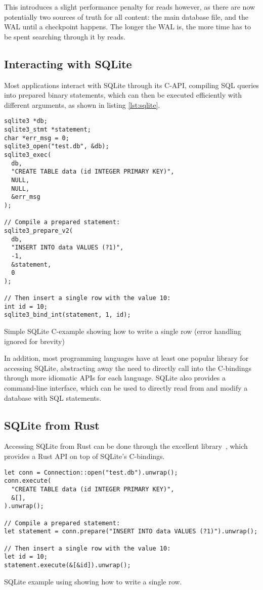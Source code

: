 This introduces a slight performance penalty for reads however, as there are now
potentially two sources of truth for all content: the main database file, and
the WAL until a checkpoint happens. The longer the WAL is, the more time has to
be spent searching through it by reads.

\subsection{Interacting with SQLite}
Most applications interact with SQLite through its C-API, compiling SQL
queries into prepared binary statements, which can then be executed efficiently
with different arguments, as shown in listing \ref{lst:sqlite}.

\begin{listing}[H]
  \begin{verbatim}
sqlite3 *db;
sqlite3_stmt *statement;
char *err_msg = 0;
sqlite3_open("test.db", &db);
sqlite3_exec(
  db,
  "CREATE TABLE data (id INTEGER PRIMARY KEY)",
  NULL,
  NULL,
  &err_msg
);

// Compile a prepared statement:
sqlite3_prepare_v2(
  db,
  "INSERT INTO data VALUES (?1)",
  -1,
  &statement,
  0
);

// Then insert a single row with the value 10:
int id = 10;
sqlite3_bind_int(statement, 1, id);
  \end{verbatim}

  \caption{Simple SQLite C-example showing how to write a single row (error
  handling ignored for brevity)}\label{lst:sqlite}
\end{listing}

In addition, most programming languages have at least one popular library for
accessing SQLite, abstracting away the need to directly call into the C-bindings
through more idiomatic APIs for each language. SQLite also provides a
command-line interface, which can be used to directly read from and modify a
database with SQL statements.

\subsection{SQLite from Rust}
Accessing SQLite from Rust can be done through the excellent 
library~\cite{rusqlite}, which
provides a Rust API on top of SQLite's C-bindings.

\begin{listing}[H]
  \begin{verbatim}
let conn = Connection::open("test.db").unwrap();
conn.execute(
  "CREATE TABLE data (id INTEGER PRIMARY KEY)",
  &[],
).unwrap();

// Compile a prepared statement:
let statement = conn.prepare("INSERT INTO data VALUES (?1)").unwrap();

// Then insert a single row with the value 10:
let id = 10;
statement.execute(&[&id]).unwrap();

  \end{verbatim}

  \caption{SQLite example using  showing how to write a single
  row.}\label{lst:sqlite-rust}
\end{listing}

